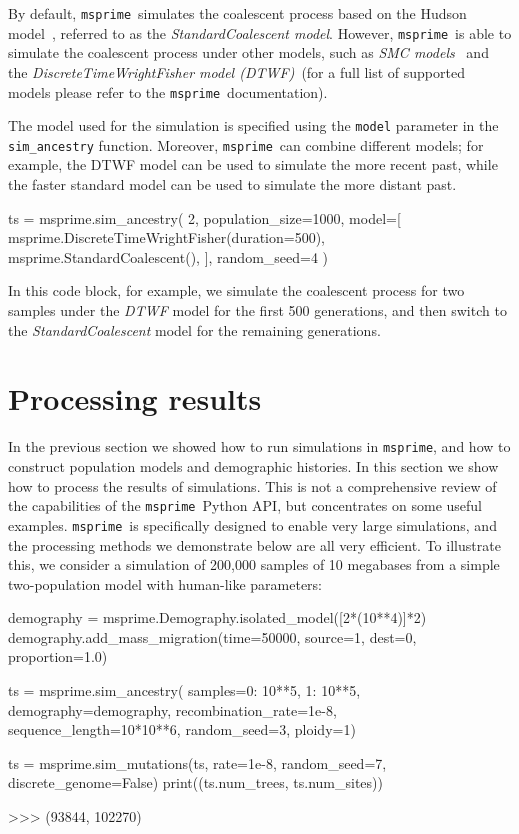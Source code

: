 \documentclass[graybox]{svmult}
\newcommand{\msprime}[0]{\texttt{msprime}}
\begin{document}
By default, \msprime\ simulates the coalescent process based on the Hudson model~\citep{hudson1983properties}, referred to as the
\emph{StandardCoalescent model}. However, \msprime\ is able to simulate the coalescent process under other models, such as
\emph{SMC models}~\citep{mcvean2005approximating} and the \emph{DiscreteTimeWrightFisher model (DTWF)}~\citep{nelson_accounting_2020}(for a full list of
supported models please refer to the \msprime\ documentation).

The model used for the simulation is specified using the \texttt{model} parameter
in the \texttt{sim\_ancestry} function. Moreover, \msprime\ can combine different models; for example, the DTWF model can be used to simulate the more recent
past, while the faster standard model can be used to simulate the more distant past.

\begin{pythoncode}
ts = msprime.sim_ancestry(
    2,
    population_size=1000,
    model=[
        msprime.DiscreteTimeWrightFisher(duration=500),
        msprime.StandardCoalescent(),
    ],
    random_seed=4
)

\end{pythoncode}

In this code block, for example, we simulate the coalescent process for two samples under the \emph{DTWF} model for the first 500 generations,
and then switch to the \emph{StandardCoalescent} model for the remaining generations.


\section{Processing results}\label{processing-results}

In the previous section we showed how to run simulations in \msprime, and
how to construct population models and demographic histories. In this
section we show how to process the results of simulations. This is not a
comprehensive review of the capabilities of the \msprime\ Python API, but
concentrates on some useful examples.
\msprime\ is specifically designed to enable very large simulations, and
the processing methods we demonstrate below are all very efficient. To
illustrate this, we consider a simulation of 200,000 samples of 10 megabases
from a simple two-population model with human-like parameters:

\begin{pythoncode}
demography = msprime.Demography.isolated_model([2*(10**4)]*2)
demography.add_mass_migration(time=50000, source=1, dest=0, proportion=1.0)

ts = msprime.sim_ancestry(
    samples={0: 10**5, 1: 10**5},
    demography=demography, recombination_rate=1e-8,
    sequence_length=10*10**6, random_seed=3,
    ploidy=1)

ts = msprime.sim_mutations(ts, rate=1e-8, random_seed=7, discrete_genome=False)
print((ts.num_trees, ts.num_sites))

>>> (93844, 102270)
\end{pythoncode}
\end{document}
